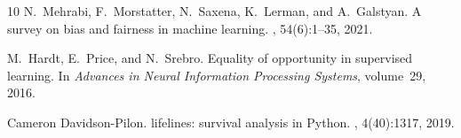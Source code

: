 \documentclass[twocolumn]{article}
\begin{document}
\begin{thebibliography}{10}
N.~Mehrabi, F.~Morstatter, N.~Saxena, K.~Lerman, and A.~Galstyan.
\newblock A survey on bias and fairness in machine learning.
, 54(6):1--35, 2021.

M.~Hardt, E.~Price, and N.~Srebro.
\newblock Equality of opportunity in supervised learning.
\newblock In {\em Advances in Neural Information Processing Systems},
  volume~29, 2016.

Cameron Davidson-Pilon.
\newblock lifelines: survival analysis in {P}ython.
, 4(40):1317, 2019.

\end{thebibliography}
\end{document}
